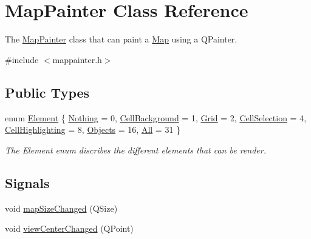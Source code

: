 \hypertarget{class_map_painter}{\section{\-Map\-Painter \-Class \-Reference}
\label{class_map_painter}
}


\-The \hyperlink{class_map_painter}{\-Map\-Painter} class that can paint a \hyperlink{class_map}{\-Map} using a \-Q\-Painter.  




{\ttfamily \#include $<$mappainter.\-h$>$}

\subsection*{\-Public \-Types}
\begin{DoxyCompactItemize}
\item 
enum \hyperlink{class_map_painter_a771b3fa246b6c13cc2acbdcf1cb6eee3}{\-Element} \{ \*
\hyperlink{class_map_painter_a771b3fa246b6c13cc2acbdcf1cb6eee3a3a60732dd05f5a7cfbb3f823ed15a8af}{\-Nothing} =  0, 
\hyperlink{class_map_painter_a771b3fa246b6c13cc2acbdcf1cb6eee3a26b2d5d6e85f1b419545f806e7e5cda2}{\-Cell\-Background} =  1, 
\hyperlink{class_map_painter_a771b3fa246b6c13cc2acbdcf1cb6eee3a2dcffdfb3d5b1bacc2c5c88cc3642b6a}{\-Grid} =  2, 
\hyperlink{class_map_painter_a771b3fa246b6c13cc2acbdcf1cb6eee3ac4845e6f97ed778c87dec34258ee0290}{\-Cell\-Selection} =  4, 
\*
\hyperlink{class_map_painter_a771b3fa246b6c13cc2acbdcf1cb6eee3a35af0e126a8ff632d0d46c5162ec9a60}{\-Cell\-Highlighting} =  8, 
\hyperlink{class_map_painter_a771b3fa246b6c13cc2acbdcf1cb6eee3a11b1008cd0aafe904943c1a11cb50ad6}{\-Objects} =  16, 
\hyperlink{class_map_painter_a771b3fa246b6c13cc2acbdcf1cb6eee3a25561a3666e5fd539263be7c6e9ab063}{\-All} =  31
 \}
\begin{DoxyCompactList}\small\item\em \-The \-Element enum discribes the different elements that can be render. \end{DoxyCompactList}\end{DoxyCompactItemize}
\subsection*{\-Signals}
\begin{DoxyCompactItemize}
\item 
void \hyperlink{class_map_painter_a8f1f85c58564d01e970bfcaf105e5f9b}{map\-Size\-Changed} (\-Q\-Size)
\item 
void \hyperlink{class_map_painter_a15c872dbb6a7321b978928df5b850ea3}{view\-Center\-Changed} (\-Q\-Point)
\end{DoxyCompactItemize}
